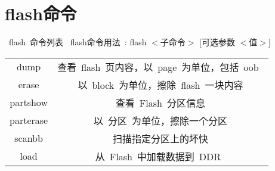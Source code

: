 \section{flash命令}
~flash~命令列表
~flash命令用法~: flash $<$子命令$>$ [可选参数 $<$值$>$]
\begin{table}[htbp]
\setlength{\parindent}{0pt}
\begin{tabular}{|c|c|} \hline
{} &  \\
\hline
  dump &   查看~flash~页内容，以~page~为单位，包括~oob~ \\
\hline
  erase &   以~block~为单位，擦除~flash~一块内容 \\
\hline
 partshow &  查看~Flash~分区信息 \\
\hline
  parterase &   以~分区~为单位，擦除一个分区 \\
\hline
  scanbb &   扫描指定分区上的坏快 \\
\hline
  load &   从~Flash~中加载数据到~DDR~ \\
\hline
\end{tabular}
\end{table}

